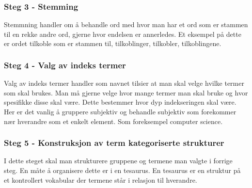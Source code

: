 \subsubsection*{Steg 3 - Stemming}
Stemmning handler om å behandle ord med hvor man har et ord som er stammen til en rekke andre ord, gjerne hvor endelsen er annerledes. Et eksempel på dette er ordet tilkoble som er stammen til, tilkoblinger, tilkobler, tilkoblingene.

\subsubsection*{Steg 4 - Valg av indeks termer}
Valg av indeks termer handler som navnet tilsier at man skal velge hvilke termer som skal brukes. Man må gjerne velge hvor mange termer man skal bruke og hvor spesifikke disse skal være. Dette bestemmer hvor dyp indekseringen skal være.
Her er det vanlig å gruppere subjektiv og behandle subjektiv som forekommer nær hverandre som et enkelt element. Som foreksempel computer science.

\subsubsection*{Steg 5 - Konstruksjon av term kategoriserte strukturer}
I dette steget skal man strukturere gruppene og termene man valgte i forrige steg. En måte å organisere dette er i en tesaurus. En tesaurus er en struktur på et kontrollert vokabular der termene står i relasjon til hverandre.
